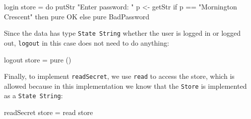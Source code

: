 \small
\begin{code}
login store = do putStr "Enter password: "
                 p <- getStr
                 if p == "Mornington Crescent"
                    then pure OK else pure BadPassword
\end{code}
\normalsize

\noindent
Since the data has type \texttt{State String} whether the user is logged
in or logged out, \texttt{logout} in this case does not need to do anything:

\small
\begin{code}
logout store = pure ()
\end{code}
\normalsize

\noindent
Finally, to implement \texttt{readSecret}, we use \texttt{read} to access
the store, which is allowed because in this implementation we know that
the \texttt{Store} is implemented as a \texttt{State String}:

\small
\begin{code}
readSecret store = read store
\end{code}
\normalsize







